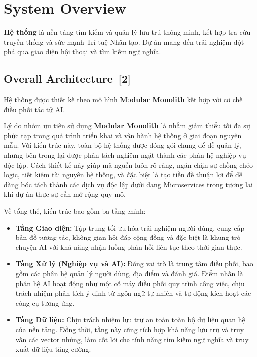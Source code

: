 \documentclass[12pt, a4paper]{article}
\begin{document}
\section{System Overview}
\textbf{Hệ thống} là nền tảng tìm kiếm và quản lý lưu trú thông minh, kết hợp tra cứu truyền thống và sức mạnh Trí tuệ Nhân tạo. Dự án mang đến trải nghiệm đột phá qua giao diện hội thoại và tìm kiếm ngữ nghĩa.

\subsection[Overall Architecture]{Overall Architecture \,{\normalfont\small\textcolor{cyan!70!black}{[2]}}}

\noindent Hệ thống được thiết kế theo mô hình \textbf{Modular Monolith} kết hợp với cơ chế điều phối tác tử AI. 

\begin{infobox}
Lý do nhóm ưu tiên sử dụng \textbf{Modular Monolith} là nhằm giảm thiểu tối đa sự phức tạp trong quá trình triển khai và vận hành hệ thống ở giai đoạn nguyên mẫu. Với kiến trúc này, toàn bộ hệ thống được đóng gói chung để dễ quản lý, nhưng bên trong lại được phân tách nghiêm ngặt thành các phân hệ nghiệp vụ độc lập. Cách thiết kế này giúp mã nguồn luôn rõ ràng, ngăn chặn sự chồng chéo logic, tiết kiệm tài nguyên hệ thống, và đặc biệt là tạo tiền đề thuận lợi để dễ dàng bóc tách thành các dịch vụ độc lập dưới dạng Microservices trong tương lai khi dự án thực sự cần mở rộng quy mô.
\end{infobox}

\noindent Về tổng thể, kiến trúc bao gồm ba tầng chính:
\begin{itemize}[label=\textcolor{blue!70!black}{\faCubes}]
  \item \textbf{Tầng Giao diện:} Tập trung tối ưu hóa trải nghiệm người dùng, cung cấp bản đồ tương tác, không gian hỏi đáp cộng đồng và đặc biệt là khung trò chuyện AI với khả năng nhận luồng phản hồi liên tục theo thời gian thực.
  \item \textbf{Tầng Xử lý (Nghiệp vụ và AI):} Đóng vai trò là trung tâm điều phối, bao gồm các phân hệ quản lý người dùng, địa điểm và đánh giá. Điểm nhấn là phân hệ AI hoạt động như một cỗ máy điều phối quy trình công việc, chịu trách nhiệm phân tích ý định từ ngôn ngữ tự nhiên và tự động kích hoạt các công cụ tương ứng.
  \item \textbf{Tầng Dữ liệu:} Chịu trách nhiệm lưu trữ an toàn toàn bộ dữ liệu quan hệ của nền tảng. Đồng thời, tầng này cũng tích hợp khả năng lưu trữ và truy vấn các vector nhúng, làm cốt lõi cho tính năng tìm kiếm ngữ nghĩa và truy xuất dữ liệu tăng cường.
\end{itemize}
\end{document}
